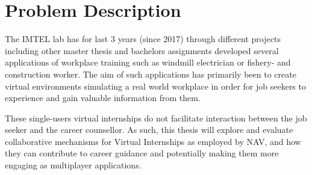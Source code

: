 \section{Problem Description}
The IMTEL lab has for last 3 years (since 2017) through different projects including other master thesis and bachelors assignments developed several applications of workplace training such as windmill electrician \cite{henrichsen2019engaging} or fishery- and construction worker. The aim of such applications has primarily been to create virtual environments simulating a real world workplace in order for job seekers to experience and gain valuable information from them.

These single-users virtual internships do not facilitate interaction between the job seeker and the career counsellor. 
As such, this thesis will explore and evaluate collaborative mechanisms for Virtual Internships as employed by NAV, and how they can contribute to career guidance and potentially making them more engaging as multiplayer applications.


\clearpage

